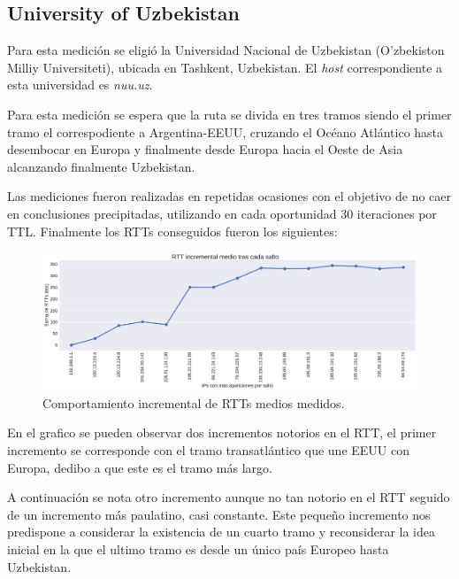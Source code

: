 \subsection{University of Uzbekistan}

Para esta medición se eligió la Universidad Nacional de Uzbekistan (O'zbekiston Milliy Universiteti), ubicada en Tashkent, Uzbekistan. El \emph{host} correspondiente a esta universidad es \emph{nuu.uz}.\par
Para esta medici\'on se espera que la ruta se divida en tres tramos siendo el primer tramo el correspodiente a Argentina-EEUU, cruzando el Océano Atlántico hasta desembocar en Europa y finalmente desde Europa hacia el Oeste de Asia alcanzando finalmente Uzbekistan.\par
Las mediciones fueron realizadas en repetidas ocasiones con el objetivo de no caer en conclusiones precipitadas, utilizando en cada oportunidad 30 iteraciones por TTL. Finalmente los RTTs conseguidos fueron los siguientes: \\
\begin{figure}[H]
    \centering
    \includegraphics[width=1\textwidth, height=1\textheight, keepaspectratio]{../img/nuu-uz-incrementales}
    \caption{Comportamiento incremental de RTTs medios medidos.}
    \label{fig:nuu-uz-incrementales}
\end{figure}
En el grafico se pueden observar dos incrementos notorios en el RTT, el primer incremento se corresponde con el tramo transatlántico que une EEUU con Europa, dedibo a que este es el tramo más largo.\par
A continuación se nota otro incremento aunque no tan notorio en el RTT seguido de un incremento más paulatino, casi constante. Este pequeño incremento nos predispone a considerar la existencia de un cuarto tramo y reconsiderar la idea inicial en la que el ultimo tramo es desde un único país Europeo hasta Uzbekistan.\par


